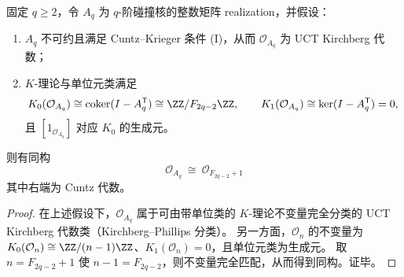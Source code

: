 \begin{proposition}[Cuntz--Krieger 碰撞核的 Fibonacci 坍缩：\texorpdfstring{$\mathcal O_{A_q}\cong \mathcal O_{F_{2q-2}+1}$}{OAq=OF+1} 的条件化识别]\label{prop:pom-collision-ck-fibonacci-collapse}
固定 \(q\ge 2\)，令 \(A_q\) 为 \(q\)-阶碰撞核的整数矩阵 realization，并假设：
\begin{enumerate}
\normalfont
  \item \(A_q\) 不可约且满足 Cuntz--Krieger 条件 (I)，从而 \(\mathcal O_{A_q}\) 为 UCT Kirchberg 代数；
  \item \(K\)-理论与单位元类满足
  \[
  K_0(\mathcal O_{A_q})\cong \mathrm{coker}(I-A_q^{\mathsf T})\cong \ZZ/F_{2q-2}\ZZ,\qquad
  K_1(\mathcal O_{A_q})\cong \ker(I-A_q^{\mathsf T})=0,
  \]
  且 \([1_{\mathcal O_{A_q}}]\) 对应 \(K_0\) 的生成元。
\end{enumerate}
则有同构
\[
\boxed{\;
\mathcal O_{A_q}\ \cong\ \mathcal O_{F_{2q-2}+1}\;}
\]
其中右端为 Cuntz 代数。
\end{proposition}
\begin{proof}
在上述假设下，\(\mathcal O_{A_q}\) 属于可由带单位类的 \(K\)-理论不变量完全分类的 UCT Kirchberg 代数类（Kirchberg--Phillips 分类）。
另一方面，\(\mathcal O_n\) 的不变量为 \(K_0(\mathcal O_n)\cong \ZZ/(n-1)\ZZ\)、\(K_1(\mathcal O_n)=0\)，且单位元类为生成元。
取 \(n=F_{2q-2}+1\) 使 \(n-1=F_{2q-2}\)，则不变量完全匹配，从而得到同构。证毕。
\end{proof}

\endinput
